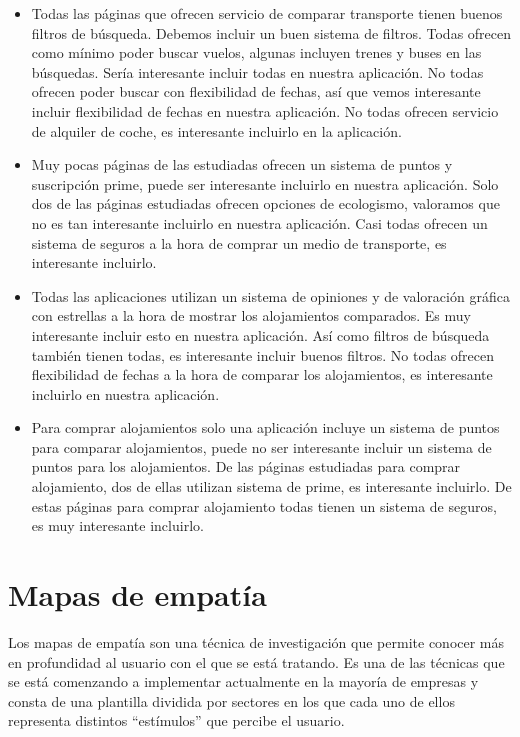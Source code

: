 \begin{itemize}
    \item Todas las páginas que ofrecen servicio de comparar transporte tienen buenos filtros de búsqueda. Debemos incluir un buen sistema de filtros. Todas ofrecen como mínimo poder buscar vuelos, algunas incluyen trenes y buses en las búsquedas. Sería interesante incluir todas en nuestra aplicación. No todas ofrecen poder buscar con flexibilidad de fechas, así que vemos interesante incluir flexibilidad de fechas en nuestra aplicación. No todas ofrecen servicio de alquiler de coche, es interesante incluirlo en la aplicación.
    \item Muy pocas páginas de las estudiadas ofrecen un sistema de puntos y suscripción prime, puede ser interesante incluirlo en nuestra aplicación. Solo dos de las páginas estudiadas ofrecen opciones de ecologismo, valoramos que no es tan interesante incluirlo en nuestra aplicación. Casi todas ofrecen un sistema de seguros a la hora de comprar un medio de transporte, es interesante incluirlo.
    \item Todas las aplicaciones utilizan un sistema de opiniones y de valoración gráfica con estrellas a la hora de mostrar los alojamientos comparados. Es muy interesante incluir esto en nuestra aplicación. Así como filtros de búsqueda también tienen todas, es interesante incluir buenos filtros. No todas ofrecen flexibilidad de fechas a la hora de comparar los alojamientos, es interesante incluirlo en nuestra aplicación.
    \item Para comprar alojamientos solo una aplicación incluye un sistema de puntos para comparar alojamientos, puede no ser interesante incluir un sistema de puntos para los alojamientos. De las páginas estudiadas para comprar alojamiento, dos de ellas utilizan sistema de prime, es interesante incluirlo. De estas páginas para comprar alojamiento todas tienen un sistema de seguros, es muy interesante incluirlo.
\end{itemize}

\section{Mapas de empatía}

Los mapas de empatía son una técnica de investigación que permite conocer más en profundidad al usuario con el que se está tratando. Es una de las técnicas que se está comenzando a implementar actualmente en la mayoría de empresas y consta de una plantilla dividida por sectores en los que cada uno de ellos representa distintos “estímulos” que percibe el usuario. \\

